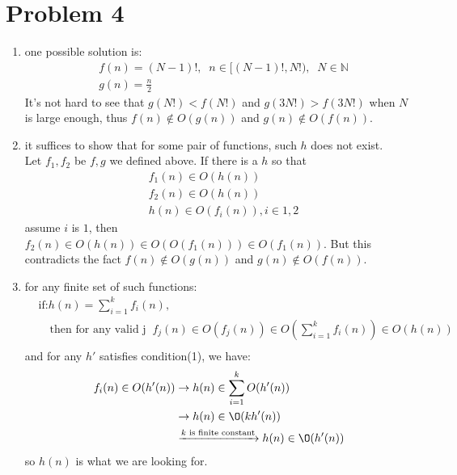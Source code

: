 \documentclass[paper=a4, fontsize=11pt]{scrartcl} %
\numberwithin{equation}{section} %
\numberwithin{figure}{section} %
\numberwithin{table}{section} %
\begin{document}
\section*{Problem 4}
\begin{enumerate}[label={4.\arabic*}]
  \item one possible solution is:
    \begin{align*}
      & f(n) = (N-1)!, \;\;n \in [(N-1)!, N!),\;\;N \in \mathbb{N}\\
      & g(n) = \frac{n}{2}
    \end{align*}
    It's not hard to see that $g(N!) < f(N!)$ and $g(3N!) > f(3N!)$ when $N$ is large enough, thus
    $f(n) \notin O(g(n))$ and $g(n) \notin O(f(n))$.

  \item it suffices to show that for some pair of functions, such $h$ does not exist.\\
    Let $f_1,f_2$ be $f,g$ we defined above. If there is a $h$ so that 
    \begin{align*}
      & f_1(n) \in O(h(n)) \\
      & f_2(n) \in O(h(n)) \\
      & h(n) \in O(f_i(n)), i \in {1,2}
    \end{align*}
    assume $i$ is $1$, then $f_2(n) \in O(h(n)) \in O(O(f_1(n))) \in O(f_1(n))$. But this
    contradicts the fact $f(n) \notin O(g(n))$ and $g(n) \notin O(f(n))$.

  \item for any finite set of such functions:
    \begin{align*}
      &\text{if:} h(n)= \sum^{k}_{i=1}f_i(n), \\
      &\quad \text{then for any valid j}\;\; f_j(n) \in O(f_j(n)) \in O(\sum^{k}_{i=1}f_i(n)) \in O(h(n)) \\
    \end{align*}
    and for any $h'$ satisfies condition(1), we have:
    \begin{align*}
      f_i(n) \in O(h'(n)) & \rightarrow h(n) \in \sum^{k}_{i=1}O(h'(n)) \\
			  & \rightarrow h(n) \in \O(kh'(n))\\
     			  & \xrightarrow{\text{$k$ is finite constant}} h(n) \in \O(h'(n))\\
    \end{align*}
    so $h(n)$ is what we are looking for.
\end{enumerate}
\end{document}
